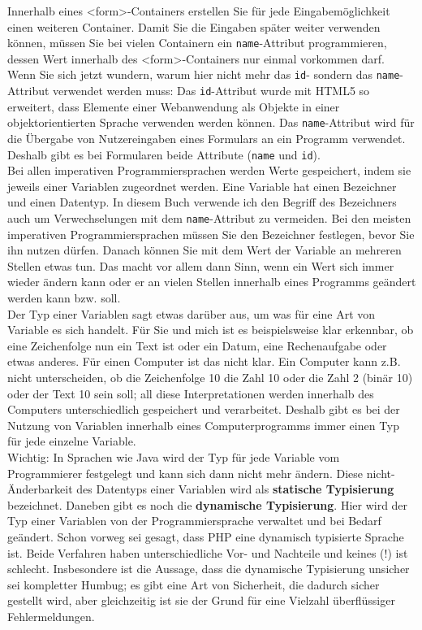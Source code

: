 Innerhalb eines <form>-Containers erstellen Sie für jede Eingabemöglichkeit einen weiteren Container. Damit Sie die Eingaben später weiter verwenden können, müssen Sie bei vielen Containern ein \verb|name|-Attribut programmieren, dessen Wert innerhalb des <form>-Containers nur einmal vorkommen darf. \\

Wenn Sie sich jetzt wundern, warum hier nicht mehr das \verb|id|- sondern das \verb|name|-Attribut verwendet werden muss: Das \verb|id|-Attribut wurde mit HTML5 so erweitert, dass Elemente einer Webanwendung als Objekte in einer objektorientierten Sprache verwenden werden können. Das \verb|name|-Attribut wird für die Übergabe von Nutzereingaben eines Formulars an ein Programm verwendet. Deshalb gibt es bei Formularen beide Attribute (\verb|name| und \verb|id|).\\

Bei allen imperativen Programmiersprachen werden Werte gespeichert, indem sie jeweils einer Variablen zugeordnet werden. Eine Variable hat einen Bezeichner und einen Datentyp. In diesem Buch verwende ich den Begriff des Bezeichners auch um Verwechselungen mit dem \verb|name|-Attribut zu vermeiden. Bei den meisten imperativen Programmiersprachen müssen Sie den Bezeichner festlegen, bevor Sie ihn nutzen dürfen. Danach können Sie mit dem Wert der Variable an mehreren Stellen etwas tun. Das macht vor allem dann Sinn, wenn ein Wert sich immer wieder ändern kann oder er an vielen Stellen innerhalb eines Programms geändert werden kann bzw. soll.\\

Der Typ einer Variablen sagt etwas darüber aus, um was für eine Art von Variable es sich handelt. Für Sie und mich ist es beispielsweise klar erkennbar, ob eine Zeichenfolge nun ein Text ist oder ein Datum, eine Rechenaufgabe oder etwas anderes. Für einen Computer ist das nicht klar. Ein Computer kann z.B. nicht unterscheiden, ob die Zeichenfolge 10 die Zahl 10 oder die Zahl 2 (binär 10) oder der Text 10 sein soll; all diese Interpretationen werden innerhalb des Computers unterschiedlich gespeichert und verarbeitet. Deshalb gibt es bei der Nutzung von Variablen innerhalb eines Computerprogramms immer einen Typ für jede einzelne Variable.\\

Wichtig: In Sprachen wie Java wird der Typ für jede Variable vom Programmierer festgelegt und kann sich dann nicht mehr ändern. Diese nicht-Änderbarkeit des Datentyps einer Variablen wird als \textbf{statische Typisierung} bezeichnet. Daneben gibt es noch die \textbf{dynamische Typisierung}. Hier wird der Typ einer Variablen von der Programmiersprache verwaltet und bei Bedarf geändert. Schon vorweg sei gesagt, dass PHP eine dynamisch typisierte Sprache ist. Beide Verfahren haben unterschiedliche Vor- und Nachteile und keines (!) ist schlecht. Insbesondere ist die Aussage, dass die dynamische Typisierung unsicher sei kompletter Humbug; es gibt eine Art von Sicherheit, die dadurch sicher gestellt wird, aber gleichzeitig ist sie der Grund für eine Vielzahl überflüssiger Fehlermeldungen.

